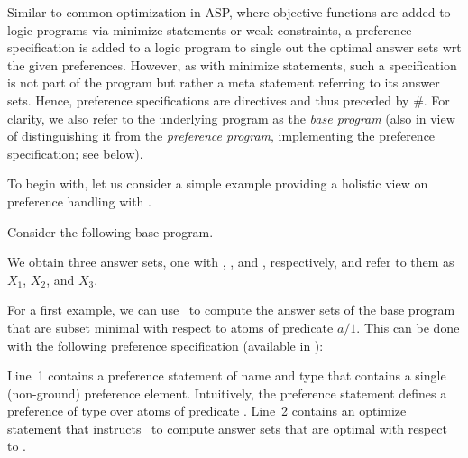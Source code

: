 Similar to common optimization in ASP,
where objective functions are added to logic programs
via minimize statements or weak constraints,
a preference specification is added to a logic program
to single out the optimal answer sets wrt the given preferences.
However, as with minimize statements,
such a specification is not part of the program
but rather a meta statement referring to its answer sets.
Hence, preference specifications are directives and thus preceded by \#.
For clarity, we also refer to the underlying program as the \emph{base program}
(also in view of distinguishing it from the \emph{preference program},
implementing the preference specification; see below).

To begin with,
let us consider a simple example providing a holistic view on preference handling with \asprin.
%
\begin{example}
\label{asprin:example1}
Consider the following base program.
%

%
We obtain three answer sets, one with , , and , respectively,
and refer to them as $X_1$, $X_2$, and $X_3$.

For a first example,
we can use \asprin\ to compute the answer sets of the base program that are subset minimal with respect to atoms of predicate $a/1$. 
This can be done with the following preference specification 
(available in ): 
%

%
Line~1 contains a preference statement of name  and type  that contains a single (non-ground) preference element.
Intuitively, the preference statement  defines a preference of type  over atoms of predicate . 
Line~2 contains an optimize statement that instructs \asprin\ to compute answer sets that are optimal with respect to . 


\end{example}
